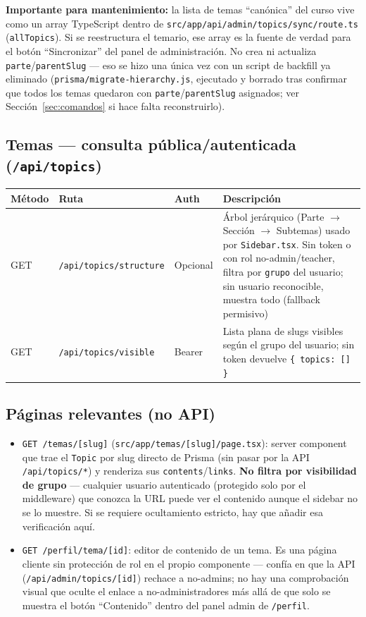 \documentclass[11pt,a4paper]{article}
\newcommand{\code}[1]{\texttt{#1}}
\begin{document}
\begin{nota}
\textbf{Importante para mantenimiento:} la lista de temas ``canónica'' del curso vive como un array TypeScript dentro de \code{src/app/api/admin/topics/sync/route.ts} (\code{allTopics}). Si se reestructura el temario, ese array es la fuente de verdad para el botón ``Sincronizar'' del panel de administración. No crea ni actualiza \code{parte}/\code{parentSlug} --- eso se hizo una única vez con un script de backfill ya eliminado (\code{prisma/migrate-hierarchy.js}, ejecutado y borrado tras confirmar que todos los temas quedaron con \code{parte}/\code{parentSlug} asignados; ver Sección~\ref{sec:comandos} si hace falta reconstruirlo).
\end{nota}

\subsection{Temas --- consulta pública/autenticada (\code{/api/topics})}

\begin{longtable}{@{}p{1.4cm}p{4.6cm}p{1.6cm}p{6.8cm}@{}}
\toprule
\textbf{Método} & \textbf{Ruta} & \textbf{Auth} & \textbf{Descripción} \\
\midrule
\endhead
GET & \code{/api/topics/structure} & Opcional & Árbol jerárquico (Parte $\rightarrow$ Sección $\rightarrow$ Subtemas) usado por \code{Sidebar.tsx}. Sin token o con rol no-admin/teacher, filtra por \code{grupo} del usuario; sin usuario reconocible, muestra todo (fallback permisivo) \\
GET & \code{/api/topics/visible} & Bearer & Lista plana de slugs visibles según el grupo del usuario; sin token devuelve \code{\{ topics: [] \}} \\
\bottomrule
\end{longtable}

\subsection{Páginas relevantes (no API)}

\begin{itemize}
  \item \code{GET /temas/[slug]} (\code{src/app/temas/[slug]/page.tsx}): server component que trae el \code{Topic} por slug directo de Prisma (sin pasar por la API \code{/api/topics/*}) y renderiza sus \code{contents}/\code{links}. \textbf{No filtra por visibilidad de grupo} --- cualquier usuario autenticado (protegido solo por el middleware) que conozca la URL puede ver el contenido aunque el sidebar no se lo muestre. Si se requiere ocultamiento estricto, hay que añadir esa verificación aquí.
  \item \code{GET /perfil/tema/[id]}: editor de contenido de un tema. Es una página cliente sin protección de rol en el propio componente --- confía en que la API (\code{/api/admin/topics/[id]}) rechace a no-admins; no hay una comprobación visual que oculte el enlace a no-administradores más allá de que solo se muestra el botón ``Contenido'' dentro del panel admin de \code{/perfil}.
\end{itemize}
\end{document}
